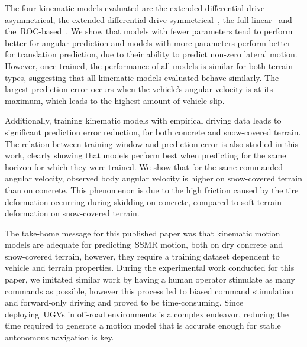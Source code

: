 \documentclass[12pt,letterpaper,oneside]{article}
\begin{document}
The four kinematic models evaluated are the extended differential-drive asymmetrical, the extended differential-drive symmetrical~\citep{Mandow2007}, the full linear~\citep{Anousaki2004} and the~\ac{ROC}-based~\citep{Wang2015}.
We show that models with fewer parameters tend to perform better for angular prediction and models with more parameters perform better for translation prediction, due to their ability to predict non-zero lateral motion.
However, once trained, the performance of all models is similar for both terrain types, suggesting that all kinematic models evaluated behave similarly.
The largest prediction error occurs when the vehicle's angular velocity is at its maximum, which leads to the highest amount of vehicle slip.

Additionally, training kinematic models with empirical driving data leads to significant prediction error reduction, for both concrete and snow-covered terrain.
The relation between training window and prediction error is also studied in this work, clearly showing that models perform best when predicting for the same horizon for which they were trained.
We show that for the same commanded angular velocity, observed body angular velocity is higher on snow-covered terrain than on concrete. 
This phenomenon is due to the high friction caused by the tire deformation occurring during skidding on concrete, compared to soft terrain deformation on snow-covered terrain.

The take-home message for this published paper was that kinematic motion models are adequate for predicting~\ac{SSMR} motion, both on dry concrete and snow-covered terrain, however, they require a training dataset dependent to vehicle and terrain properties.
During the experimental work conducted for this paper, we imitated similar work by having a human operator stimulate as many commands as possible, however this process led to biased command stimulation and forward-only driving and proved to be time-consuming.
Since deploying~\acp{UGV} in off-road environments is a complex endeavor, reducing the time required to generate a motion model that is accurate enough for stable autonomous navigation is key.

\begin{center}
	\textbf{}
\end{center}
\end{document}
